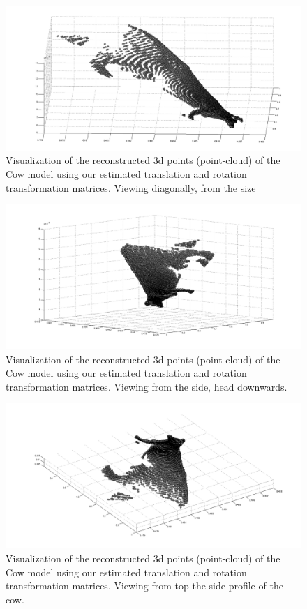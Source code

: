 \documentclass{paper}
\begin{document}
\begin{figure}[H]
\centering
\includegraphics[width=\textwidth]{figures/rec_esti_1}
\caption{Visualization of the reconstructed 3d points (point-cloud) of the Cow model using our estimated translation and rotation transformation matrices. Viewing diagonally, from the size}
\label{fig:cow_rec_us_1}
\end{figure}

\begin{figure}[H]
\centering
\includegraphics[width=\textwidth]{figures/rec_esti_2}
\caption{Visualization of the reconstructed 3d points (point-cloud) of the Cow model using our estimated translation and rotation transformation matrices. Viewing from the side, head downwards.}
\label{fig:cow_rec_us_2}
\end{figure}

\begin{figure}[H]
\centering
\includegraphics[width=\textwidth]{figures/rec_esti_3}
\caption{Visualization of the reconstructed 3d points (point-cloud) of the Cow model using our estimated translation and rotation transformation matrices. Viewing from top the side profile of the cow.}
\label{fig:cow_rec_us_3}
\end{figure}
\end{document}
